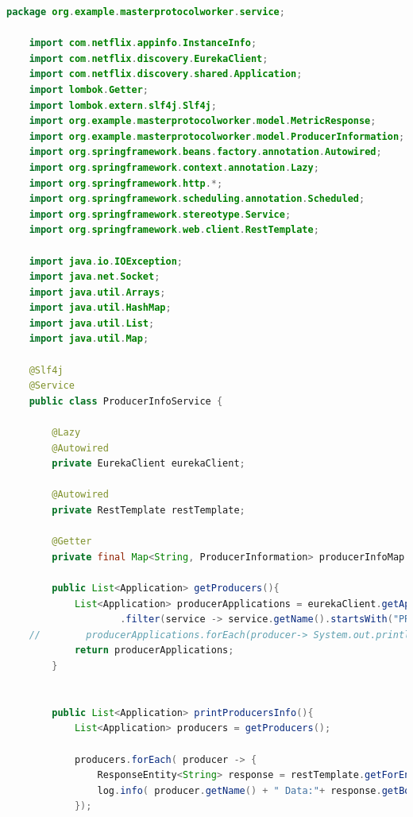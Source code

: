 \begin{lstlisting}[language=Java, caption=Kod usługi ProducerInfoService,label=ProducerInfoServiceCode]
    package org.example.masterprotocolworker.service;

    import com.netflix.appinfo.InstanceInfo;
    import com.netflix.discovery.EurekaClient;
    import com.netflix.discovery.shared.Application;
    import lombok.Getter;
    import lombok.extern.slf4j.Slf4j;
    import org.example.masterprotocolworker.model.MetricResponse;
    import org.example.masterprotocolworker.model.ProducerInformation;
    import org.springframework.beans.factory.annotation.Autowired;
    import org.springframework.context.annotation.Lazy;
    import org.springframework.http.*;
    import org.springframework.scheduling.annotation.Scheduled;
    import org.springframework.stereotype.Service;
    import org.springframework.web.client.RestTemplate;
    
    import java.io.IOException;
    import java.net.Socket;
    import java.util.Arrays;
    import java.util.HashMap;
    import java.util.List;
    import java.util.Map;
    
    @Slf4j
    @Service
    public class ProducerInfoService {
    
        @Lazy
        @Autowired
        private EurekaClient eurekaClient;
    
        @Autowired
        private RestTemplate restTemplate;
    
        @Getter
        private final Map<String, ProducerInformation> producerInfoMap = new HashMap<>();
    
        public List<Application> getProducers(){
            List<Application> producerApplications = eurekaClient.getApplications().getRegisteredApplications().stream()
                    .filter(service -> service.getName().startsWith("PRODUCER-")).toList();
    //        producerApplications.forEach(producer-> System.out.println(producer.getName()));
            return producerApplications;
        }
    
    
        public List<Application> printProducersInfo(){
            List<Application> producers = getProducers();
    
            producers.forEach( producer -> {
                ResponseEntity<String> response = restTemplate.getForEntity(producer.getInstances().get(0).getHomePageUrl()+"actuator/metrics",String.class);
                log.info( producer.getName() + " Data:"+ response.getBody());
            });
    

\end{lstlisting}
